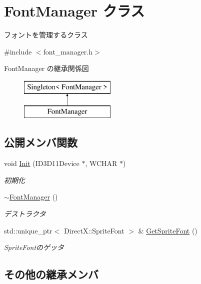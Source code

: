 \hypertarget{class_font_manager}{}\section{Font\+Manager クラス}
\label{class_font_manager}


フォントを管理するクラス  




{\ttfamily \#include $<$font\+\_\+manager.\+h$>$}

Font\+Manager の継承関係図\begin{figure}[H]
\begin{center}
\leavevmode
\includegraphics[height=2.000000cm]{class_font_manager}
\end{center}
\end{figure}
\subsection*{公開メンバ関数}
\begin{DoxyCompactItemize}
\item 
void \mbox{\hyperlink{class_font_manager_acabba97ebae69b7b92d2ea4a2e9216e4}{Init}} (I\+D3\+D11\+Device $\ast$, W\+C\+H\+AR $\ast$)
\begin{DoxyCompactList}\small\item\em 初期化 \end{DoxyCompactList}\item 
\mbox{\hyperlink{class_font_manager_aa190bb023b4cf2ad28e24c69ef57f380}{$\sim$\+Font\+Manager}} ()
\begin{DoxyCompactList}\small\item\em デストラクタ \end{DoxyCompactList}\item 
std\+::unique\+\_\+ptr$<$ Direct\+X\+::\+Sprite\+Font $>$ \& \mbox{\hyperlink{class_font_manager_a612a8922fc977b07959406468dec922f}{Get\+Sprite\+Font}} ()
\begin{DoxyCompactList}\small\item\em Sprite\+Fontのゲッタ \end{DoxyCompactList}\end{DoxyCompactItemize}
\subsection*{その他の継承メンバ}


